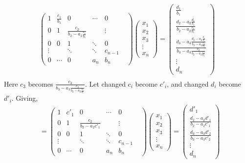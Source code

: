 \documentclass[12pt]{article}
\begin{document}
\begin{align*}
\begin{pmatrix}
  1 & \frac{c_1}{b_1} & 0 & \cdots & 0 \\
  0 & 1 & \frac{c_2}{b_2 - a_2\frac{c_1}{b_1}} & & \vdots \\
 0 & 0 & 1 & \ddots & 0 & \\
\vdots & & \ddots & \ddots & c_{n-1} \\ 
0 & \cdots & 0 & a_n & b_n
\end{pmatrix}
\begin{pmatrix}
x_1 \\ x_2 \\ x_3 \\ \vdots \\ x_n 
\end{pmatrix}
= 
\begin{pmatrix}
  \frac{d_1}{b_1} \\ \frac{d_2 - a_2\frac{d_1}{b_1}}{b_2 - a_2\frac{c_1}{b_1}} \\ \frac{d_3 - a_3\frac{d_2 - a_2\frac{d_1}{b_1}}{b_2 - a_2\frac{c_1}{b_1}}}{b_3 - a_3\frac{c_2}{b_2 - a_2\frac{c_1}{b_1}}} \\ \vdots \\ d_n 
\end{pmatrix} \\[10pt]
    \end{align*}
    Here $c_3$ becomes $\frac{c_3}{b_3 - a_3\frac{c_2}{b_2 - a_2\frac{c_1}{b_1}}}$. Let changed $c_i$ become $c'_i$, and changed $d_i$ become $d'_i$. Giving,
    \begin{align*}
      &=\begin{pmatrix}
        1 & c'_1 & 0 & \cdots & 0 \\
        0 & 1 & \frac{c_2}{b_2 - a_2c'_1} & & \vdots \\
       0 & 0 & 1 & \ddots & 0 & \\
      \vdots & & \ddots & \ddots & c_{n-1} \\ 
      0 & \cdots & 0 & a_n & b_n
      \end{pmatrix}
      \begin{pmatrix}
      x_1 \\ x_2 \\ x_3 \\ \vdots \\ x_n 
      \end{pmatrix}
      = 
      \begin{pmatrix}
        d'_1 \\ \frac{d_2 - a_2d'_1}{b_2 - a_2c'_1} \\ \frac{d_3 - a_3d'_2}{b_3 - a_3c'_2} \\ \vdots \\ d_n 
      \end{pmatrix} \\[10pt]
    \end{align*}
\end{document}
